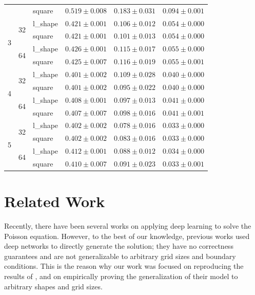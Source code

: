 \begin{table}[h]
\begin{tabular}{lllccc}
  &    & square &  $0.519\pm0.008$ &  $0.183\pm0.031$ &  $0.094\pm0.001$ \\
\cmidrule(lr){1-6}
\multirow{4}{*}{3} & \multirow{2}{*}{32} & l\_shape &  $0.421\pm0.001$ &  $0.106\pm0.012$ &  $0.054\pm0.000$ \\
  &    & square &  $0.421\pm0.001$ &  $0.101\pm0.013$ &  $0.054\pm0.000$ \\
\cmidrule(lr){2-6}
  & \multirow{2}{*}{64} & l\_shape &  $0.426\pm0.001$ &  $0.115\pm0.017$ &  $0.055\pm0.000$ \\
  &    & square &  $0.425\pm0.007$ &  $0.116\pm0.019$ &  $0.055\pm0.001$ \\
\cmidrule(lr){1-6}
\multirow{4}{*}{4} & \multirow{2}{*}{32} & l\_shape &  $0.401\pm0.002$ &  $0.109\pm0.028$ &  $0.040\pm0.000$ \\
  &    & square &  $0.401\pm0.002$ &  $0.095\pm0.022$ &  $0.040\pm0.000$ \\
\cmidrule(lr){2-6}
  & \multirow{2}{*}{64} & l\_shape &  $0.408\pm0.001$ &  $0.097\pm0.013$ &  $0.041\pm0.000$ \\
  &    & square &  $0.407\pm0.007$ &  $0.098\pm0.016$ &  $0.041\pm0.001$ \\
\cmidrule(lr){1-6}
\multirow{4}{*}{5} & \multirow{2}{*}{32} & l\_shape &  $0.402\pm0.002$ &  $0.078\pm0.016$ &  $0.033\pm0.000$ \\
  &    & square &  $0.402\pm0.002$ &  $0.083\pm0.016$ &  $0.033\pm0.000$ \\
\cmidrule(lr){2-6}
  & \multirow{2}{*}{64} & l\_shape &  $0.412\pm0.001$ &  $0.088\pm0.012$ &  $0.034\pm0.000$ \\
  &    & square &  $0.410\pm0.007$ &  $0.091\pm0.023$ &  $0.033\pm0.001$ \\
\bottomrule
\end{tabular}
    \label{tab:best_model_results}
\end{table}

\FloatBarrier
\section{Related Work}
Recently, there have been several works on applying deep learning to solve the Poisson equation. However, to the best of our knowledge, previous works used deep networks to directly generate the solution; they have no correctness guarantees and are not generalizable to arbitrary grid sizes and
boundary conditions. This is the reason why our work was focused on reproducing the results of \cite{original_paper}, and on empirically proving the generalization of their model to arbitrary shapes and grid sizes.
